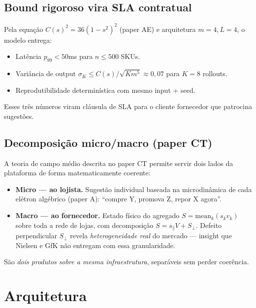 \documentclass[11pt,a4paper]{article}
\begin{document}
\subsection{Bound rigoroso vira SLA contratual}

Pela equação $C(s)^2 = 36(1-s^2)^2$ (paper AE) e arquitetura $m=4, L=4$, o
modelo entrega:

\begin{itemize}[leftmargin=2em]
  \item Latência $p_{99} < 50$ms para $n \le 500$ SKUs.
  \item Variância de output $\sigma_K \le C(s)/\sqrt{Km^5} \approx 0{,}07$
        para $K=8$ rollouts.
  \item Reprodutibilidade determinística com mesmo input + seed.
\end{itemize}

Esses três números viram cláusula de SLA para o cliente fornecedor que
patrocina sugestões.

\subsection{Decomposição micro/macro (paper CT)}

A teoria de campo médio descrita no paper CT permite servir dois lados
da plataforma de forma matematicamente coerente:

\begin{itemize}[leftmargin=2em]
  \item \textbf{Micro --- ao lojista.} Sugestão individual baseada na
        microdinâmica de cada elétron algébrico (paper A): ``compre Y,
        promova Z, repor X agora''.
  \item \textbf{Macro --- ao fornecedor.} Estado físico do agregado
        $S = \mathrm{mean}_k(s_k v_k)$ sobre toda a rede de lojas, com
        decomposição $S = s_\| V + S_\perp$. Defeito perpendicular
        $S_\perp$ revela \emph{heterogeneidade real} do mercado --- insight
        que Nielsen e GfK não entregam com essa granularidade.
\end{itemize}

São \emph{dois produtos sobre a mesma infraestrutura}, separáveis sem
perder coerência.

\section{Arquitetura}
\end{document}

